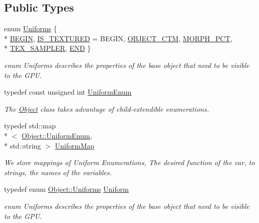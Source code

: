 \subsection*{Public Types}
\begin{DoxyCompactItemize}
\item 
enum \hyperlink{class_object_a8c11d8700b0bb79a46c61f2de4f23fa3}{Uniforms} \{ \\*
\hyperlink{class_object_a8c11d8700b0bb79a46c61f2de4f23fa3a8a65225741e4db1df295c9cab71a98c0}{B\-E\-G\-I\-N}, 
\hyperlink{class_object_a8c11d8700b0bb79a46c61f2de4f23fa3a8fecaee23530c9befe7feb5166e81484}{I\-S\-\_\-\-T\-E\-X\-T\-U\-R\-E\-D} =  B\-E\-G\-I\-N, 
\hyperlink{class_object_a8c11d8700b0bb79a46c61f2de4f23fa3a9aaf45d5144b52065016b5b39e909851}{O\-B\-J\-E\-C\-T\-\_\-\-C\-T\-M}, 
\hyperlink{class_object_a8c11d8700b0bb79a46c61f2de4f23fa3ac93e286d52dad730ccf3fdab9b102902}{M\-O\-R\-P\-H\-\_\-\-P\-C\-T}, 
\\*
\hyperlink{class_object_a8c11d8700b0bb79a46c61f2de4f23fa3a85f87adc3e3d4242733729ee87b21423}{T\-E\-X\-\_\-\-S\-A\-M\-P\-L\-E\-R}, 
\hyperlink{class_object_a8c11d8700b0bb79a46c61f2de4f23fa3ad78facbf844c1259f464a49061e1d7ed}{E\-N\-D}
 \}
\begin{DoxyCompactList}\small\item\em enum Uniforms describes the properties of the base object that need to be visible to the G\-P\-U. \end{DoxyCompactList}\item 
typedef const unsigned int \hyperlink{class_object_a79b74057dbc5182b85c9c3ba8480fcf2}{Uniform\-Enum}
\begin{DoxyCompactList}\small\item\em The \hyperlink{class_object}{Object} class takes advantage of child-\/extendible enumerations. \end{DoxyCompactList}\item 
typedef std\-::map\\*
$<$ \hyperlink{class_object_a79b74057dbc5182b85c9c3ba8480fcf2}{Object\-::\-Uniform\-Enum}, \\*
std\-::string $>$ \hyperlink{class_object_a6e19bd8516360bff956408cbae33b878}{Uniform\-Map}
\begin{DoxyCompactList}\small\item\em We store mappings of Uniform Enumerations, The desired function of the var, to strings, the names of the variables. \end{DoxyCompactList}\item 
typedef enum \hyperlink{class_object_a8c11d8700b0bb79a46c61f2de4f23fa3}{Object\-::\-Uniforms} \hyperlink{class_object_ae6a2969ddca87d2c54b7cb1c131a7d60}{Uniform}
\begin{DoxyCompactList}\small\item\em enum Uniforms describes the properties of the base object that need to be visible to the G\-P\-U. \end{DoxyCompactList}\end{DoxyCompactItemize}

